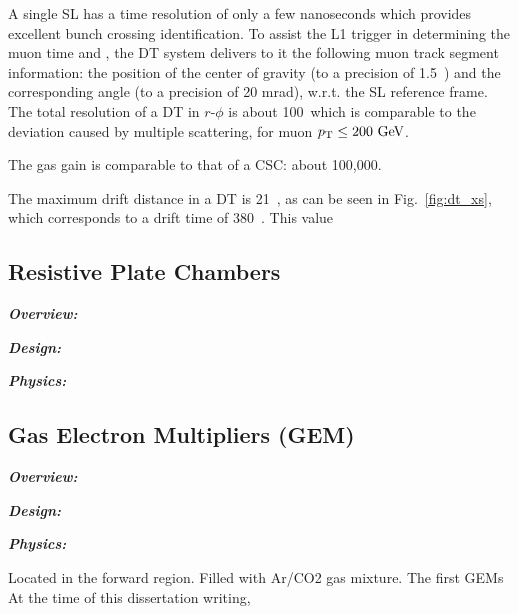 A single SL has a time resolution of only a few nanoseconds which provides excellent bunch crossing identification.
To assist the L1 trigger in determining the muon time and \pt, the DT system delivers to it the following muon track segment information:
the position of the center of gravity (to a precision of 1.5~\mm) and the corresponding angle (to a precision of 20 mrad), w.r.t. the SL reference frame.
The total resolution of a DT in $r$-$\phi$ is about 100~\mum which is comparable to the deviation caused by multiple scattering, for muon $p_{\mathrm{T}} \le 200~\mbox{GeV}$.

The gas gain is comparable to that of a CSC: about 100,000.

The maximum drift distance in a DT is 21~\mm, as can be seen in Fig.~\ref{fig:dt_xs}, which corresponds to a drift time of 380~\ns.
This value 

\subsection{Resistive Plate Chambers}
\label{subsec:rpc}

\textbf{\textit{Overview:}}

\textbf{\textit{Design:}}

\textbf{\textit{Physics:}}

\subsection{Gas Electron Multipliers (GEM)}
\label{subsec:gem}

\textbf{\textit{Overview:}}

\textbf{\textit{Design:}}

\textbf{\textit{Physics:}}

Located in the forward region.
Filled with Ar/CO2 gas mixture.
The first GEMs At the time of this dissertation writing, 







